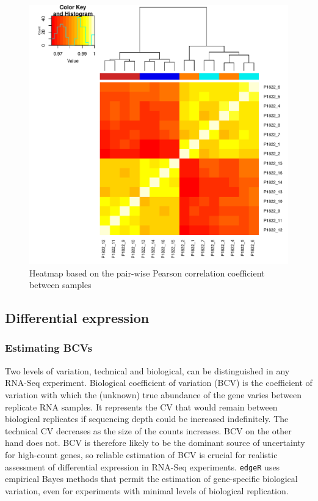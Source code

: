 \documentclass[12pt]{article}
\begin{document}
\begin{figure}[H]
\begin{center}
\includegraphics{9999_report-fig3}
\end{center}
\caption{Heatmap based on the pair-wise Pearson correlation coefficient between samples}
\end{figure} 

\subsection{Differential expression} 

\subsubsection{Estimating BCVs}
Two levels of variation, technical and biological, can be distinguished in any RNA-Seq experiment. Biological coefficient of variation (BCV) is the coefficient of variation with which the (unknown) true abundance of the gene varies between replicate RNA samples. It represents the CV that would remain between biological replicates if sequencing depth could be increased indefinitely. The technical CV decreases as the size of the counts increases. BCV on the other hand does not. BCV is therefore likely to be the dominant source of uncertainty for high-count genes, so reliable estimation of BCV is crucial for realistic assessment of differential expression in RNA-Seq experiments. \texttt{edgeR} uses empirical Bayes methods that permit the estimation of gene-specific biological variation, even for experiments with minimal levels of biological replication.
\end{document}
